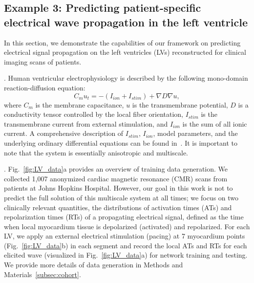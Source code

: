 \documentclass[review]{elsarticle}
\begin{document}
%
%
%
\subsection{Example 3: Predicting patient-specific electrical wave propagation in the left ventricle}
\label{subsec:LV}

In this section, we demonstrate the capabilities of our framework on predicting electrical signal propagation on the left ventricles (LVs) reconstructed for clinical imaging scans of patients.

. 
Human ventricular electrophysiology is described by the following mono-domain reaction-diffusion equation:
\begin{equation}
    C_{m}u_{t} = -(I_{ion} + I_{stim}) + \nabla D \nabla u, 
\end{equation}
where $C_{m}$ is the membrane capacitance, $u$ is the transmembrane potential, $D$ is a conductivity tensor controlled by the local fiber orientation, $I_{stim}$ is the transmembrane current from external stimulation, and $I_{ion}$ is the sum of all ionic current. A comprehensive description of $I_{stim}$, $I_{ion}$, model parameters, and the underlying ordinary differential equations can be found in~\cite{ten2004model,ten2006alternans}. It is important to note that the system is essentially anisotropic and multiscale. 

. Fig.~\ref{fig:LV_data}a provides an overview of training data generation. We collected 1,007 anonymized cardiac magnetic resonance (CMR) scans from patients at Johns Hopkins Hospital. However, our goal in this work is not to predict the full solution of this multiscale system at all times; we focus on two clinically relevant quantities, the distributions of activation times (ATs) and repolarization times (RTs) of a propagating electrical signal, defined as the time when local myocardium tissue is depolarized (activated) and repolarized. For each LV, we apply an external electrical stimulation (pacing) at 7 myocardium points (Fig.~\ref{fig:LV_data}b) in each segment and record the local ATs and RTs for each elicited wave (visualized in Fig.~\ref{fig:LV_data}a) for network training and testing. We provide more details of data generation in Methods and Materials~\ref{subsec:cohort}.
\end{document}
